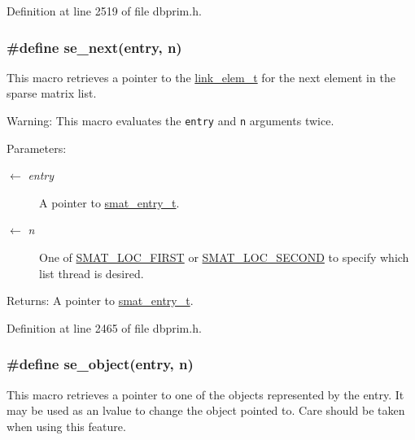 Definition at line 2519 of file dbprim.h.\hypertarget{group__dbprim__smat_ga61}{
\subsubsection[se\_\-next]{\setlength{\rightskip}{0pt plus 5cm}\#define se\_\-next(entry, n)}}
\label{group__dbprim__smat_ga61}


This macro retrieves a pointer to the \hyperlink{group__dbprim__link_ga1}{link\_\-elem\_\-t} for the next element in the sparse matrix list.

\begin{Desc}
\item[Warning:]This macro evaluates the {\tt entry} and {\tt n} arguments twice.\end{Desc}
\begin{Desc}
\item[Parameters:]
\begin{description}
\item[\mbox{$\leftarrow$} {\em entry}]A pointer to \hyperlink{group__dbprim__smat_ga2}{smat\_\-entry\_\-t}. \item[\mbox{$\leftarrow$} {\em n}]One of \hyperlink{group__dbprim__smat_gga70a137}{SMAT\_\-LOC\_\-FIRST} or \hyperlink{group__dbprim__smat_gga70a138}{SMAT\_\-LOC\_\-SECOND} to specify which list thread is desired.\end{description}
\end{Desc}
\begin{Desc}
\item[Returns:]A pointer to \hyperlink{group__dbprim__smat_ga2}{smat\_\-entry\_\-t}.\end{Desc}


Definition at line 2465 of file dbprim.h.\hypertarget{group__dbprim__smat_ga65}{
\subsubsection[se\_\-object]{\setlength{\rightskip}{0pt plus 5cm}\#define se\_\-object(entry, n)}}
\label{group__dbprim__smat_ga65}


This macro retrieves a pointer to one of the objects represented by the entry. It may be used as an lvalue to change the object pointed to. Care should be taken when using this feature.

